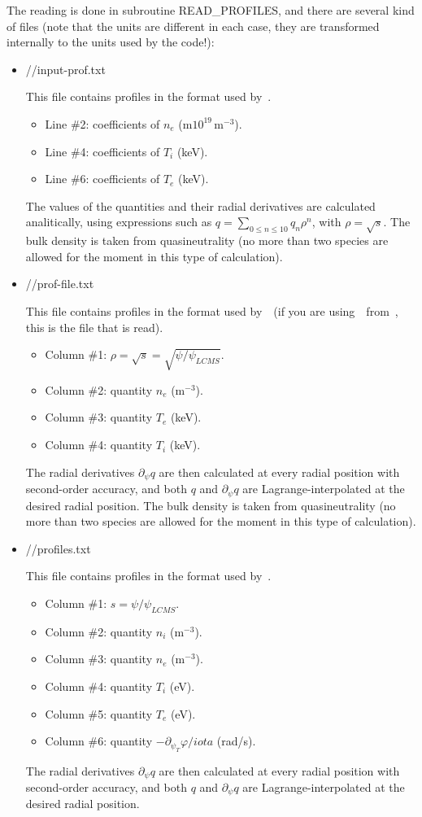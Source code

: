The reading is done in subroutine {\ttfamily READ\_PROFILES}, and there are several kind of files (note that the units are different in each case, they are transformed internally to the units used by the code!): 
\begin{itemize}

  
\item {\ttfamily //input-prof.txt}

This file contains profiles in the format used by~\TASKTD.
\begin{itemize}
\item Line \#2: coefficients of $n_e$ (m$10^{19}\,$m$^{-3}$).
\item Line \#4: coefficients of $T_i$ (keV).
\item Line \#6: coefficients of $T_e$ (keV).
\end{itemize}
The values of the quantities and their radial derivatives are calculated analitically, using expressions such as $q=\sum_{0\le n\le 10} q_n\rho^n$, with $
\rho=\sqrt{s}$. The bulk density is taken from quasineutrality (no more than two species are allowed for the moment in this type of calculation).


\item {\ttfamily //prof-file.txt}

This file contains profiles in the format used by~\TASKTD~(if you are using~\KNOSOS~from~\TASKTD, this is the file that is read).
\begin{itemize}
\item Column \#1: $\rho=\sqrt{s}=\sqrt{\psi/\psi_{LCMS}}$.
\item Column \#2: quantity $n_e$ (m$^{-3}$).
\item Column \#3: quantity $T_e$ (keV).
\item Column \#4: quantity $T_i$ (keV).
\end{itemize}
The radial derivatives $\partial_\psi q$ are then calculated at every  radial position with second-order accuracy, and both $q$ and $\partial_\psi q$ are Lagrange-interpolated at the desired radial position. The bulk density is taken from quasineutrality (no more than two species are allowed for the moment in this type of calculation).


\item {\ttfamily //profiles.txt}

This file contains profiles in the format used by~\NEOTWO.
\begin{itemize}
\item Column \#1: $s=\psi/\psi_{LCMS}$.
\item Column \#2: quantity $n_i$ (m$^{-3}$).
\item Column \#3: quantity $n_e$ (m$^{-3}$).
\item Column \#4: quantity $T_i$ (eV).
\item Column \#5: quantity $T_e$ (eV).
\item Column \#6: quantity $-\partial_{\psi_T}\varphi/iota$ (rad/s).
\end{itemize}
The radial derivatives $\partial_\psi q$ are then calculated at every  radial position with second-order accuracy, and both $q$ and $\partial_\psi q$ are Lagrange-interpolated at the desired radial position.



\end{itemize}
